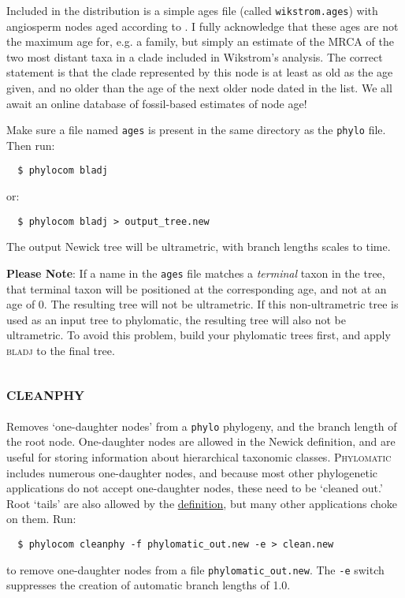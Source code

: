 \documentclass[12pt,letterpaper]{article}
\begin{document}
Included in the distribution is a simple ages file (called
\verb|wikstrom.ages|) with angiosperm nodes aged according to
\citet{wikstrom2001evo}. I fully acknowledge that these ages are not
the maximum age for, e.g. a family, but simply an estimate of the MRCA
of the two most distant taxa in a clade included in Wikstrom's
analysis. The correct statement is that the clade represented by this
node is at least as old as the age given, and no older than the age of
the next older node dated in the list. We all await an online database
of fossil-based estimates of node age!

Make sure a file named \verb|ages| is present in the same directory as the
\verb|phylo| file. Then run:
\begin{verbatim}
  $ phylocom bladj
\end{verbatim}
or:
\begin{verbatim}
  $ phylocom bladj > output_tree.new
\end{verbatim}
The output Newick tree will be ultrametric, with branch lengths scales
to time.

{\bf Please Note}: If a name in the \texttt{ages} file matches a {\it
  terminal} taxon in the tree, that terminal taxon will be positioned
at the corresponding age, and not at an age of 0.  The resulting tree
will not be ultrametric.  If this non-ultrametric tree is used as an
input tree to phylomatic, the resulting tree will also not be
ultrametric.  To avoid this problem, build your phylomatic trees
first, and apply {\scshape bladj} to the final tree.

\subsection{\scshape cleanphy}

Removes `one-daughter nodes' from a \verb|phylo| phylogeny, and the
branch length of the root node.  One-daughter nodes are allowed in the
Newick definition, and are useful for storing information about
hierarchical taxonomic classes. {\scshape Phylomatic} includes
numerous one-daughter nodes, and because most other phylogenetic
applications do not accept one-daughter nodes, these need to be
`cleaned out.'  Root `tails' are also allowed by the
\href{http://evolution.genetics.washington.edu/phylip/newick_doc.html}{definition},
but many other applications choke on them. Run:
\begin{verbatim}
  $ phylocom cleanphy -f phylomatic_out.new -e > clean.new 
\end{verbatim}
to remove one-daughter nodes from a file
\verb|phylomatic_out.new|. The \verb|-e| switch suppresses the
creation of automatic branch lengths of 1.0. 
\end{document}
